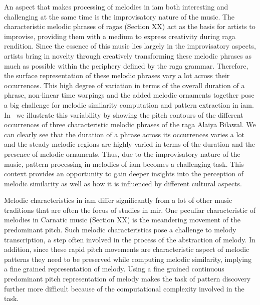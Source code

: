 An aspect that makes processing of melodies in \gls{iam} both interesting and challenging at the same time is the improvisatory nature of the music. The characteristic melodic phrases of \glspl{raga} (Section XX) act as the basis for artists to improvise, providing them with a medium to express creativity during \gls{raga} rendition. Since the essence of this music lies largely in the improvisatory aspects, artists bring in novelty through creatively transforming these melodic phrases as much as possible within the periphery defined by the \gls{raga} grammar. Therefore, the surface representation of these melodic phrases vary a lot across their occurrences. This high degree of variation in terms of the overall duration of a phrase, non-linear time warpings and the added melodic ornaments together pose a big challenge for melodic similarity computation and pattern extraction in \gls{iam}. In~ we illustrate this variability by showing the pitch contours of the different occurrences of three characteristic melodic phrases of the \gls{raga} Alaiya Bilawal. We can clearly see that the duration of a phrase across its occurrences varies a lot and the steady melodic regions are highly varied in terms of the duration and the presence of melodic ornaments. Thus, due to the improvisatory nature of the music, pattern processing in melodies of \gls{iam} becomes a challenging task. This context provides an opportunity to gain deeper insights into the perception of melodic similarity as well as how it is influenced by different cultural aspects. 

Melodic characteristics in \gls{iam} differ significantly from a lot of other music traditions that are often the focus of studies in \gls{mir}. One peculiar characteristic of  melodies in Carnatic music (Section XX) is the meandering movement of the predominant pitch. Such melodic characteristics pose a challenge to melody transcription, a step often involved in the process of the abstraction of melody. In addition, since these rapid pitch movements are characteristic aspect of melodic patterns they need to be preserved while computing melodic similarity, implying a fine grained representation of melody. Using a fine grained continuous predominant pitch representation of melody makes the task of pattern discovery further more difficult because of the computational complexity involved in the task.


